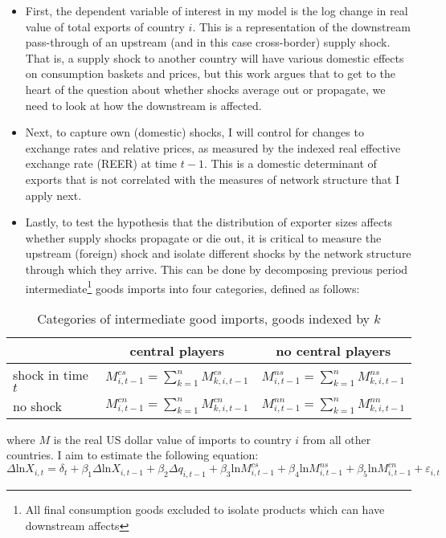 \documentclass[10pt,letterpaper]{article}
\begin{document}
\begin{itemize}
\item First, the dependent variable of interest in my model is the log change in real value of total exports of country $i$. This is a representation of the downstream pass-through of an upstream (and in this case cross-border) supply shock. That is, a supply shock to another country will have various domestic effects on consumption baskets and prices, but this work argues that to get to the heart of the question about whether shocks average out or propagate, we need to look at how the downstream is affected.
\item Next, to capture own (domestic) shocks, I will control for changes to exchange rates and relative prices, as measured by the indexed real effective exchange rate (REER) at time $t-1$. This is a domestic determinant of exports that is not correlated with the measures of network structure that I apply next.
\item Lastly, to test the hypothesis that the distribution of exporter sizes affects whether supply shocks propagate or die out, it is critical to measure the upstream (foreign) shock and isolate different shocks by the network structure through which they arrive. This can be done by decomposing previous period intermediate\footnote{All final consumption goods excluded to isolate products which can have downstream affects} goods imports into four categories, defined as follows:
\end{itemize}



	\begin{table}[h]\centering \caption{Categories of intermediate good imports, goods indexed by $k$ \label{mtab}}
	\begin{tabular}{l | c | c}
	\toprule
	 & central players & no central players \\
	 \midrule
	 shock in time $t$ & $M^{cs}_{i,t-1} = \sum_{k=1}^{n} M^{cs}_{k,i,t-1}$ & $M^{ns}_{i,t-1} = \sum_{k=1}^{n}M^{ns}_{k,i,t-1}$ \\
	 \midrule
	 no shock & $M^{cn}_{i,t-1} = \sum_{k=1}^{n} M^{cn}_{k,i,t-1}$ & $M^{nn}_{i,t-1} = \sum_{k=1}^{n}M^{nn}_{k,i,t-1}$ \\
	 \bottomrule
	\end{tabular}
	\end{table}
	
	\vspace{2mm}
	
where $M$ is the real US dollar value of imports to country $i$ from all other countries. I aim to estimate the following equation:
$$ \Delta \text{ln} X_{i,t} = \delta_{t} + \beta_1 \Delta \text{ln} X_{i,t-1} + \beta_2 \Delta q_{i,t-1} + \beta_3 \text{ln} M^{cs}_{i,t-1} + \beta_4 \text{ln} M^{ns}_{i,t-1} + \beta_5 \text{ln} M^{cn}_{i,t-1} + \varepsilon_{i,t} $$
\end{document}
